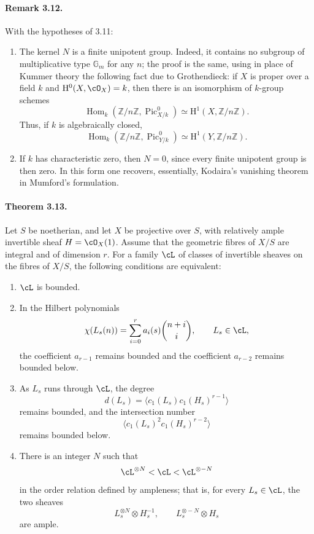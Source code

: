 \documentclass[11pt]{article}
\theoremstyle{plain}
\theoremstyle{definition}
\theoremstyle{remark}
\newcommand{\ZZ}{\mathbb Z}
\DeclareMathOperator{\Hom}{Hom}
\DeclareMathOperator{\Pic}{Pic}
\newcommand{\Gm}{\mathbb G_m}
\newcommand{\HH}{\mathrm H}
\begin{document}
\paragraph{Remark 3.12.}
With the hypotheses of 3.11:
\begin{enumerate}[label=\roman*)]
\item The kernel $N$ is a finite unipotent group. Indeed, it contains no subgroup of multiplicative type $\Gm$ for any $n$; the proof is the same, using in place of Kummer theory the following fact due to Grothendieck: if $X$ is proper over a field $k$ and $\HH^0(X,\cO_X)=k$, then there is an isomorphism of $k$-group schemes
\[
\Hom_k(\ZZ/n\ZZ,\Pic^0_{X/k})\simeq \HH^1(X,\ZZ/n\ZZ).
\]
Thus, if $k$ is algebraically closed,
\[
\Hom_k(\ZZ/n\ZZ,\Pic^0_{Y/k})\simeq \HH^1(Y,\ZZ/n\ZZ).
\]
\item If $k$ has characteristic zero, then $N=0$, since every finite unipotent group is then zero. In this form one recovers, essentially, Kodaira's vanishing theorem in Mumford's formulation.
\end{enumerate}

\paragraph{Theorem 3.13.}
Let $S$ be noetherian, and let $X$ be projective over $S$, with relatively ample invertible sheaf $H=\cO_X(1)$. Assume that the geometric fibres of $X/S$ are integral and of dimension $r$. For a family $\cL$ of classes of invertible sheaves on the fibres of $X/S$, the following conditions are equivalent:
\begin{enumerate}[label=\roman*)]
\item $\cL$ is bounded.
\item In the Hilbert polynomials
\[
\chi(L_s(n))=\sum_{i=0}^r a_i(s)\binom{n+i}{i},\qquad L_s\in\cL,
\]
the coefficient $a_{r-1}$ remains bounded and the coefficient $a_{r-2}$ remains bounded below.
\item As $L_s$ runs through $\cL$, the degree
\[
d(L_s)=\langle c_1(L_s)c_1(H_s)^{r-1}\rangle
\]
remains bounded, and the intersection number
\[
\langle c_1(L_s)^2c_1(H_s)^{r-2}\rangle
\]
remains bounded below.
\item There is an integer $N$ such that
\[
\cL^{\otimes N}<\cL<\cL^{\otimes -N}
\]
in the order relation defined by ampleness; that is, for every $L_s\in\cL$, the two sheaves
\[
L_s^{\otimes N}\otimes H_s^{-1},\qquad L_s^{\otimes -N}\otimes H_s
\]
are ample.
\end{enumerate}
\end{document}
